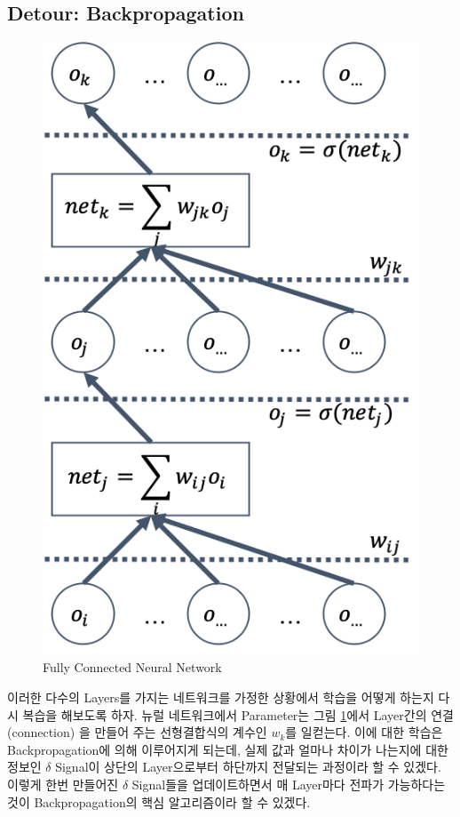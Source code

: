 \documentclass[draft=false]{oblivoir}
\begin{document}
\subsection{Detour: Backpropagation}
 
 \begin{figure}[ht] \centering 
  \includegraphics[scale=0.6]{fig4.png}
  \caption{Fully Connected Neural Network}
  \label{fig:16-4}
\end{figure}
 
 이러한 다수의 Layers를 가지는 네트워크를 가정한 상황에서 학습을 어떻게 하는지 다시 복습을 해보도록 하자. 뉴럴 네트워크에서 Parameter는 그림 \ref{fig:16-4}에서 Layer간의 연결(connection) 을 만들어 주는 선형결합식의 계수인 $w_k$를 일컫는다. 이에 대한 학습은 Backpropagation에 의해 이루어지게 되는데, 실제 값과 얼마나 차이가 나는지에 대한 정보인 $\delta$ Signal이 상단의 Layer으로부터 하단까지 전달되는 과정이라 할 수 있겠다. 이렇게 한번 만들어진 $\delta$ Signal들을 업데이트하면서 매 Layer마다 전파가 가능하다는 것이 Backpropagation의 핵심 알고리즘이라 할 수 있겠다.
\end{document}
